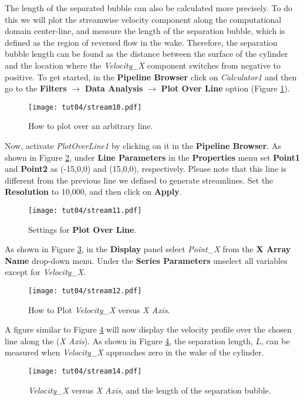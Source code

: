 The length of the separated bubble can also be calculated more precisely. To do this we will plot the streamwise velocity component along the computational domain center-line, and measure the length of the separation bubble, which is defined as the region of reversed flow in the wake. Therefore, the separation bubble length can be found as the distance between the surface of the cylinder and the location where the \textit{Velocity\_X} component switches from negative to positive. To get started, in the \textbf{Pipeline Browser} click on \textit{Calculator1} and then go to the \textbf{Filters} $\rightarrow$ \textbf{Data Analysis} $\rightarrow$ \textbf{Plot Over Line} option (Figure \ref{fig4:stream10_4}).
\begin{figure}[htbp]
    \centering
    \texttt{[image: tut04/stream10.pdf]}
    \caption{How to plot over an arbitrary line.}
    \label{fig4:stream10_4}
\end{figure}
Now, activate \textit{PlotOverLine1} by clicking on it in the \textbf{Pipeline Browser}. As shown in Figure \ref{fig4:stream11_4}, under \textbf{Line Parameters} in the \textbf{Properties} menu set \textbf{Point1} and \textbf{Point2} as (-15,0,0) and (15,0,0), respectively. Please note that this line is different from the previous line we defined to generate streamlines. Set the \textbf{Resolution} to 10,000, and then click on \textbf{Apply}.
\begin{figure}[htbp]
    \centering
    \texttt{[image: tut04/stream11.pdf]}
    \caption{Settings for \textbf{Plot Over Line}.}
    \label{fig4:stream11_4}
\end{figure}
As shown in Figure \ref{fig4:stream12_4}, in the \textbf{Display} panel select \textit{Point\_X} from the \textbf{X Array Name} drop-down menu. Under the \textbf{Series Parameters} unselect all variables except for \textit{Velocity\_X}.
\begin{figure}[htbp]
    \centering
    \texttt{[image: tut04/stream12.pdf]}
    \caption{How to Plot \textit{Velocity\_X} versus \textit{X Axis}.}
    \label{fig4:stream12_4}
\end{figure}
A figure similar to Figure \ref{fig4:stream14_4} will now display the velocity profile over the chosen line along the (\textit{X Axis}). As shown in Figure \ref{fig4:stream14_4}, the separation length, $L$, can be measured when \textit{Velocity\_X} approaches zero in the wake of the cylinder.
\begin{figure}[htbp]
    \centering
    \texttt{[image: tut04/stream14.pdf]}
    \caption{\textit{Velocity\_X} versus \textit{X Axis}, and the length of the separation bubble.}
    \label{fig4:stream14_4}
\end{figure}
